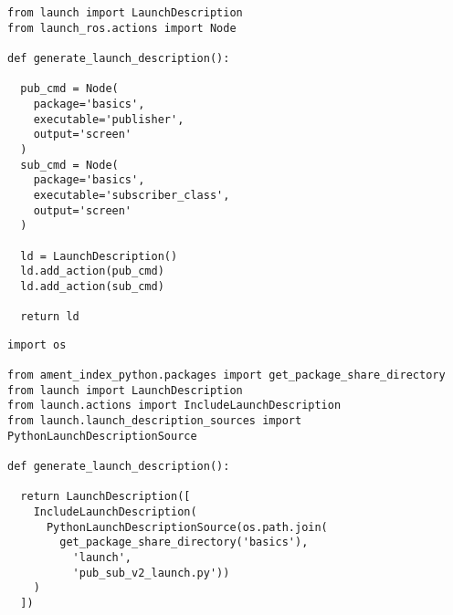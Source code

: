  \footnotesize
\begin{tcolorbox}[sharp corners, colframe=gray!80, colback=LightGray, left=0pt, top=0pt, bottom=0pt, title=\texttt{br2\_basics/launch/pub\_sub\_v1\_launch.py}]
  \begin{verbatim}
from launch import LaunchDescription
from launch_ros.actions import Node

def generate_launch_description():

  pub_cmd = Node(
    package='basics',
    executable='publisher',
    output='screen'
  )
  sub_cmd = Node(
    package='basics',
    executable='subscriber_class',
    output='screen'
  )
  
  ld = LaunchDescription()
  ld.add_action(pub_cmd)
  ld.add_action(sub_cmd)

  return ld
    \end{verbatim}
    \end{tcolorbox}
  \normalsize

 \footnotesize
\begin{tcolorbox}[sharp corners, colframe=gray!80, colback=LightGray, left=0pt, top=0pt, bottom=0pt, title=\texttt{br2\_basics/launch/includer\_launch.py}]
  \begin{verbatim}
import os

from ament_index_python.packages import get_package_share_directory
from launch import LaunchDescription
from launch.actions import IncludeLaunchDescription
from launch.launch_description_sources import PythonLaunchDescriptionSource

def generate_launch_description():
  
  return LaunchDescription([
    IncludeLaunchDescription(
      PythonLaunchDescriptionSource(os.path.join(
        get_package_share_directory('basics'),
          'launch',
          'pub_sub_v2_launch.py'))
    )
  ])
    \end{verbatim}
    \end{tcolorbox}
  \normalsize

